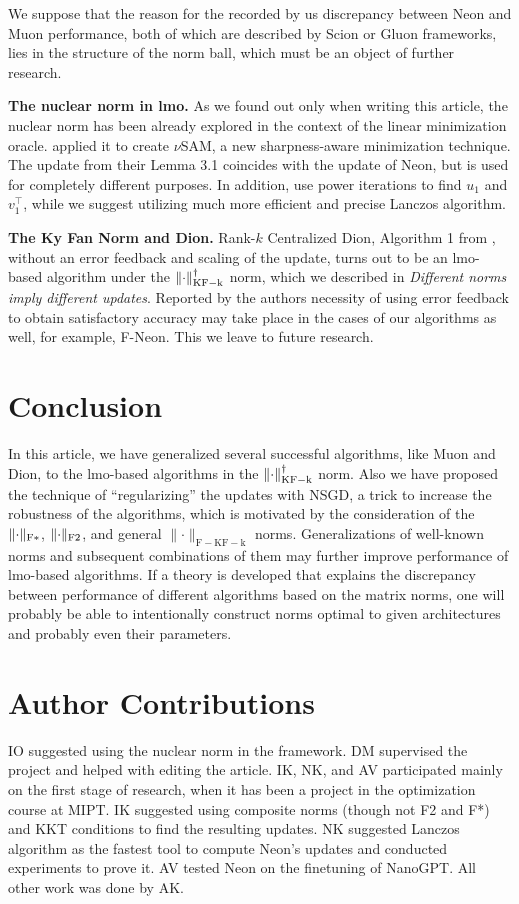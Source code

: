 \documentclass{article} %
\newcommand{\norm}[1]{\lVert #1\rVert}
\DeclarePairedDelimiter{\normkfk}{\|}{\|_\mathrm{KF-k}}
\DeclarePairedDelimiter{\normfstar}{\|}{\|_\mathrm{F*}}
\DeclarePairedDelimiter{\normftwo}{\|}{\|_\mathrm{F2}}
\begin{document}
We suppose that the reason for the recorded by us discrepancy between Neon and Muon performance, both of which are described by Scion or Gluon frameworks, lies in the structure of the norm ball, which must be an object of further research.

{\bf The nuclear norm in lmo.} As we found out only when writing this article, the nuclear norm has been already explored in the context of the linear minimization oracle. \citet{pethick2025sam} applied it to create $\nu$SAM, a new sharpness-aware minimization technique. The update from their Lemma 3.1 coincides with the update of Neon, but is used for completely different purposes. In addition, \citet{pethick2025sam} use power iterations to find $u_1$ and $v_1^\top$, while we suggest utilizing much more efficient and precise Lanczos algorithm.

{\bf The Ky Fan Norm and Dion.} Rank-$k$ Centralized Dion, Algorithm 1 from \citet{ahn2025dioncommunicationefficientoptimizerlarge}, without an error feedback and scaling of the update, turns out to be an lmo-based algorithm under the $\normkfk{\cdot}^\dagger$ norm, which we described in {\it Different norms imply different updates}. Reported by the authors necessity of using error feedback to obtain satisfactory accuracy may take place in the cases of our algorithms as well, for example, F-Neon. This we leave to future research.

\section{Conclusion}
In this article, we have generalized several successful algorithms, like Muon and Dion, to the lmo-based algorithms in the $\normkfk{\cdot}^\dagger$ norm. Also we have proposed the technique of ``regularizing'' the updates with NSGD, a trick to increase the robustness of the algorithms, which is motivated by the consideration of the $\normfstar{\cdot}$, $\normftwo{\cdot}$, and general $\norm{\cdot}_{\mathrm{F-KF-k}}$ norms. Generalizations of well-known norms and subsequent combinations of them may further improve performance of lmo-based algorithms. If a theory is developed that explains the discrepancy between performance of different algorithms based on the matrix norms, one will probably be able to intentionally construct norms optimal to given architectures and probably even their parameters.

\section{Author Contributions}
IO suggested using the nuclear norm in the \citet{bernstein2024oldoptimizernewnorm} framework. DM supervised the project and helped with editing the article. IK, NK, and AV participated mainly on the first stage of research, when it has been a project in the optimization course at MIPT. IK suggested using composite norms (though not F2 and F*) and KKT conditions to find the resulting updates. NK suggested Lanczos algorithm as the fastest tool to compute Neon's updates and conducted experiments to prove it. AV tested Neon on the finetuning of NanoGPT. All other work was done by AK.
\end{document}
